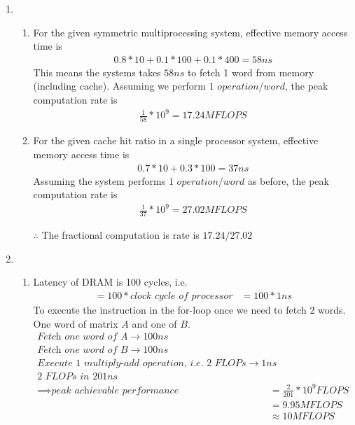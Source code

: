 \documentclass{article}
\begin{document}
\begin{enumerate}[label=\Large\textbf{\arabic*}.]
\item  
\begin{enumerate}[label={\arabic*}.]
	\item 
		For the given symmetric multiprocessing system, effective memory access time is 
		\begin{align*}
			0.8 * 10 + 0.1 * 100 + 0.1 * 400 = 58 ns
		\end{align*}
		This means the systems takes $58ns$ to fetch 1 word from memory (including cache).
		Assuming we perform $1$ $operation/word$, the peak computation rate is
		\begin{align*}
			\frac{1}{58} * 10^9 = 17.24MFLOPS
		\end{align*}
	\item
		For the given cache hit ratio in a single processor system, effective memory access time is
		\begin{align*}
			0.7 * 10 + 0.3 * 100 = 37ns
		\end{align*}
		Assuming the system performs $1$ $operation/word$ as before, the peak computation rate is 
		\begin{align*}
			\frac{1}{37} * 10 ^ 9 = 27.02 MFLOPS
		\end{align*}
		
		$\therefore$ The fractional computation is rate is $17.24 / 27.02$
\end{enumerate} 



\item
\begin{enumerate}[label={\arabic*}.]
	\item
	Latency of DRAM is 100 cycles, i.e. 
	\begin{align*}
		= 100 * \textit{clock cycle of processor}
		&= 100 * 1ns
	\end{align*}
	To execute the instruction in the for-loop once we need to fetch 2 words. One word of matrix $A$ and one of $B$. 
	\begin{align*}
		\textit{Fetch one word of A} \to100ns		
		\\\textit{Fetch one word of B} \to 100ns
		\\\textit{Execute 1 multiply-add operation, i.e. 2 FLOPs} \to 1ns
		\\\textit{2 FLOPs in } 201ns
		\\\implies \textit{peak achievable performance} &= \frac{2}{201} * 10^9 FLOPS
		\\&= 9.95 MFLOPS 
		\\&\approx 10 MFLOPS
	\end{align*}
	

\end{enumerate}
\end{enumerate}
\end{document}
